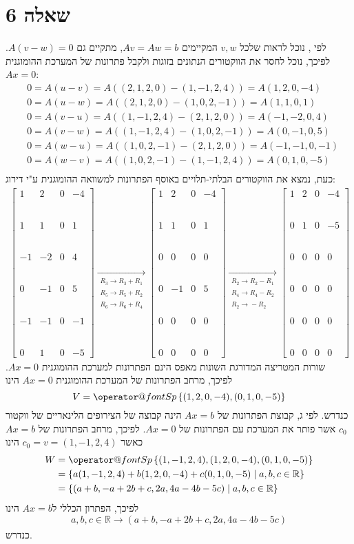 \documentclass[11pt, oneside]{article}
\makeatletter
\newcommand{\qed}{\R{$\blacksquare$}}
\newcommand{\br}{\\\\\\\\\\\\}
\newcommand{\opr}[1]{\xrightarrow[\text{#1}]{}}
\newcommand{\oprm}[1]{\underset{\substack{#1}}{\longrightarrow}}
\newcommand{\mR}{\mathbb{R}}
\newcommand{\q}[3]{\R{שאלה #3#2.#1}}
\newcommand{\Sp}[1]{\mathop{\operator@font Sp}#1}
\makeatother
\begin{document}
\section{שאלה 6}
לפי \q{3}{7}{1.}, נוכל לראות שלכל $v, w$ המקיימים $Av = Aw = b$, מתקיים גם $A(v - w) = 0$. לפיכך, נוכל לחסר את הווקטורים הנתונים בזוגות ולקבל פתרונות של המערכת ההומוגנית $Ax = 0$:
\begin{align*}
& 0 = A(u - v) = A((2, 1, 2, 0) - (1, -1, 2, 4)) = A(1, 2, 0, -4)\\
& 0 = A(u - w) = A((2, 1, 2, 0) - (1, 0, 2, -1)) = A(1, 1, 0, 1)\\
& 0 = A(v - u) = A((1, -1, 2, 4) - (2, 1, 2, 0)) = A(-1, -2, 0, 4)\\
& 0 = A(v - w) = A((1, -1, 2, 4) - (1, 0, 2, -1)) = A(0, -1, 0, 5)\\
& 0 = A(w - u) = A((1, 0, 2, -1) - (2, 1, 2, 0)) = A(-1, -1, 0, -1)\\
& 0 = A(w - v) = A((1, 0, 2, -1) - (1, -1, 2, 4)) = A(0, 1, 0, -5)\\
\end{align*}
כעת, נמצא את הווקטורים הבלתי-תלויים באוסף הפתרונות למשוואה ההומוגנית ע"י דירוג:
\begin{align*}
\begin{bmatrix}
1 & 2 & 0 & -4\br
1 & 1 & 0 & 1\br
-1 & -2 & 0 & 4\br
0 & -1 & 0 & 5\br
-1 & -1 & 0 & -1\br
0 & 1 & 0 & -5
\end{bmatrix}
\oprm{%
R_3 \opr{} R_3 + R_1\\
R_5 \opr{} R_5 + R_2\\
R_6 \opr{} R_6 + R_4
}
\begin{bmatrix}
1 & 2 & 0 & -4\br
1 & 1 & 0 & 1\br
0 & 0 & 0 & 0\br
0 & -1 & 0 & 5\br
0 & 0 & 0 & 0\br
0 & 0 & 0 & 0
\end{bmatrix}
\oprm{%
R_2 \opr{} R_2 - R_1\\
R_4 \opr{} R_4 - R_2\\
R_2 \opr{} -R_2
}
\begin{bmatrix}
1 & 2 & 0 & -4\br
0 & 1 & 0 & -5\br
0 & 0 & 0 & 0\br
0 & 0 & 0 & 0\br
0 & 0 & 0 & 0\br
0 & 0 & 0 & 0
\end{bmatrix}
\end{align*}
שורות המטריצה המדורגת השונות מאפס הינם הפתרונות למערכת ההומוגנית $Ax = 0$. לפיכך, מרחב הפתרונות של המערכת ההומוגנית $Ax = 0$ הינו
\[
V = \Sp\left\{(1, 2, 0, -4), (0, 1, 0, -5)\right\}
\]
כנדרש. לפי \q{3}{7}{1.}ג, קבוצת הפתרונות של $Ax = b$ הינה קבוצה של הצירופים הלינאריים של ווקטור $c_0$ אשר פותר את המערכת עם הפתרונות של $Ax = 0$. לפיכך, מרחב הפתרונות של $Ax = b$ כאשר $c_0 = v = (1, -1, 2, 4)$ הינו
\begin{align*}
W
& = \Sp\left\{(1, -1, 2, 4), (1, 2, 0, -4), (0, 1, 0, -5)\right\}\\
& = \left\{a(1, -1, 2, 4) + b(1, 2, 0, -4) + c(0, 1, 0, -5) \mid a, b, c \in \mR\right\}\\
& = \left\{(a + b, -a + 2b + c, 2a, 4a - 4b - 5c) \mid a, b, c \in \mR\right\}
\end{align*}
לפיכך, הפתרון הכללי ל$Ax = b$ הינו
\[
a, b, c \in \mR \opr{} (a + b, -a + 2b + c, 2a, 4a - 4b - 5c)
\]
כנדרש.
\br\qed
\end{document}
